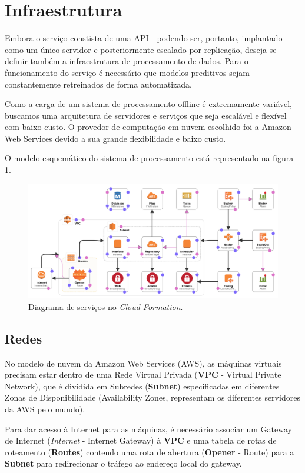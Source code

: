 \documentclass[pfc]{imetex}
\begin{document}
\section{Infraestrutura}
Embora o serviço constista de uma API - podendo ser, portanto, implantado como um único servidor e posteriormente escalado por replicação, deseja-se definir também a infraestrutura de processamento de dados. Para o funcionamento do serviço é necessário que modelos preditivos sejam constantemente retreinados de forma automatizada.

Como a carga de um sistema de processamento offline é extremamente variável, buscamos uma arquitetura de servidores e serviços que seja escalável e flexível com baixo custo. O provedor de computação em nuvem escolhido foi a Amazon Web Services devido a sua grande flexibilidade e baixo custo.

O modelo esquemático do sistema de processamento está representado na figura \ref{fig:cloudformation}.

\begin{figure}
\label{fig:cloudformation}
\includegraphics[width=\linewidth]{cloudformation.png}
\caption{Diagrama de serviços no \textit{Cloud Formation}.}
\end{figure}

\subsection{Redes}

No modelo de nuvem da Amazon Web Services (AWS), as máquinas virtuais precisam estar dentro de uma Rede Virtual Privada (\textbf{VPC} - Virtual Private Network), que é dividida em Subredes (\textbf{Subnet}) especificadas em diferentes Zonas de Disponibilidade (Availability Zones, representam os diferentes servidores da AWS pelo mundo).

Para dar acesso à Internet para as máquinas, é necessário associar um Gateway de Internet (\textit{Internet} - Internet Gateway) à \textbf{VPC} e uma tabela de rotas de roteamento (\textbf{Routes}) contendo uma rota de abertura (\textbf{Opener} - Route) para a \textbf{Subnet} para redirecionar o tráfego ao endereço local do gateway.
\end{document}
